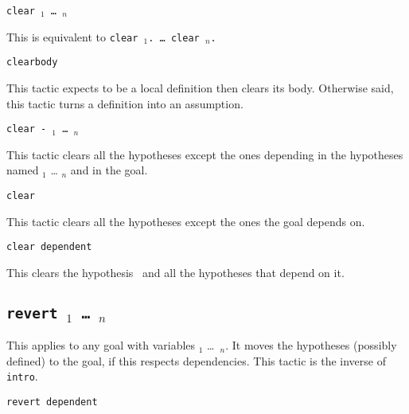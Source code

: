 \begin{coq_example*}
\begin{Variants}
\item {\tt clear {\ident$_1$} \dots\ {\ident$_n$}}

  This is equivalent to {\tt clear {\ident$_1$}. {\ldots} clear
    {\ident$_n$}.}

\item {\tt clearbody {\ident}}

  This tactic expects {\ident} to be a local definition then clears
  its body. Otherwise said, this tactic turns a definition into an
  assumption.

  \ErrMsg {}

\item \texttt{clear - {\ident$_1$} \dots\ {\ident$_n$}}

  This tactic clears all the hypotheses except the ones depending in
  the hypotheses named {\ident$_1$} {\ldots} {\ident$_n$} and in the
  goal.

\item \texttt{clear}

  This tactic clears all the hypotheses except the ones the goal depends on.

\item {\tt clear dependent \ident {}}

 This clears the hypothesis \ident\ and all the hypotheses
 that depend on it.

\end{Variants}

\subsection{\tt revert \ident$_1$ \dots\ \ident$_n$}
\label{revert}

This applies to any goal with variables \ident$_1$ \dots\ \ident$_n$.
It moves the hypotheses (possibly defined) to the goal, if this respects
dependencies. This tactic is the inverse of {\tt intro}.

\begin{ErrMsgs}
\item {}
\item {}
\end{ErrMsgs}

\begin{Variants}
\item {\tt revert dependent \ident {}}


\end{Variants}
\end{coq_example*}
